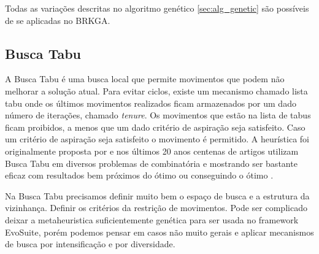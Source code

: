 \documentclass[12pt,a4paper]{article}
\begin{document}
        Todas as variações descritas no algoritmo genético \ref{sec:alg_genetic} são possíveis de se aplicadas no BRKGA. 

\subsection{Busca Tabu}

    A Busca Tabu é uma busca local que permite movimentos que podem não melhorar a solução atual. Para evitar ciclos, existe um mecanismo chamado lista tabu onde os últimos movimentos realizados
    ficam armazenados por um dado número de iterações, chamado \textit{tenure}. Os movimentos que estão na lista de tabus ficam proibidos, a menos que um dado critério de aspiração seja
    satisfeito. Caso um critério de aspiração seja satisfeito o movimento é permitido. A heurística foi originalmente proposta por \citeauthor{glover1986future} \cite{glover1986future} e nos
    últimos 20 anos centenas de artigos utilizam Busca Tabu em diversos problemas de combinatória e mostrando ser bastante eficaz com resultados bem próximos do ótimo ou conseguindo o ótimo
    \cite{gendreau2010handbook}.

    Na Busca Tabu precisamos definir muito bem o espaço de busca e a estrutura da vizinhança. Definir os critérios da restrição de movimentos. Pode ser complicado deixar a metaheuristica
    suficientemente genética para ser usada no framework EvoSuite, porém podemos pensar em casos não muito gerais e aplicar mecanismos de busca por intensificação e por diversidade.





\end{document}
